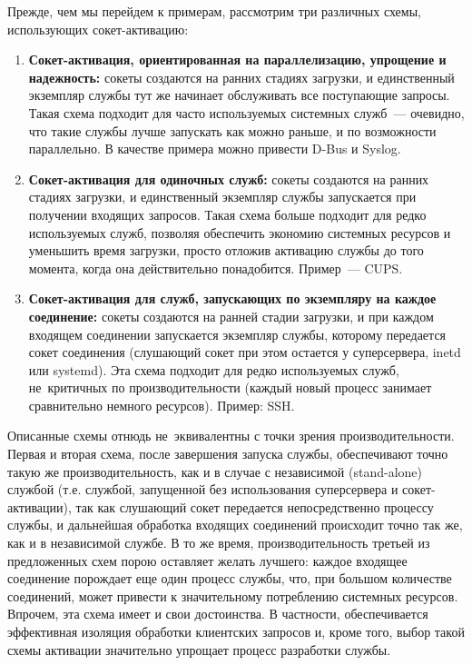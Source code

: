 \documentclass[10pt,oneside,a4paper]{article}
\begin{document}
Прежде, чем мы перейдем к примерам, рассмотрим три различных схемы, использующих
сокет-активацию:
\begin{enumerate}
	\item \textbf{Сокет-активация, ориентированная на параллелизацию,
		упрощение и надежность:} сокеты создаются на ранних стадиях
		загрузки, и единственный экземпляр службы тут же начинает
		обслуживать все поступающие запросы. Такая схема подходит для
		часто используемых системных служб~--- очевидно, что такие
		службы лучше запускать как можно раньше, и по возможности
		параллельно. В качестве примера можно привести D-Bus и Syslog.
	\item \textbf{Сокет-активация для одиночных служб:} сокеты создаются на
		ранних стадиях загрузки, и единственный экземпляр службы
		запускается при получении входящих запросов. Такая схема больше
		подходит для редко используемых служб, позволяя обеспечить
		экономию системных ресурсов и уменьшить время загрузки, просто
		отложив активацию службы до того момента, когда она
		действительно понадобится. Пример~--- CUPS.
	\item \textbf{Сокет-активация для служб, запускающих по экземпляру на
		каждое соединение:} сокеты создаются на ранней стадии загрузки,
		и при каждом входящем соединении запускается экземпляр службы,
		которому передается сокет соединения (слушающий сокет при этом
		остается у суперсервера, inetd или systemd). Эта схема подходит
		для редко используемых служб, не~критичных по производительности
		(каждый новый процесс занимает сравнительно немного ресурсов).
		Пример: SSH.
\end{enumerate}

Описанные схемы отнюдь не~эквивалентны с точки зрения производительности. Первая
и вторая схема, после завершения запуска службы, обеспечивают точно такую же
производительность, как и в случае с независимой (stand-alone) службой (т.е.
службой, запущенной без использования суперсервера и сокет-активации), так как
слушающий сокет передается непосредственно процессу службы, и дальнейшая
обработка входящих соединений происходит точно так же, как и в независимой
службе. В то же время, производительность третьей из предложенных схем порою
оставляет желать лучшего: каждое входящее соединение порождает еще один процесс
службы, что, при большом количестве соединений, может привести к значительному
потреблению системных ресурсов. Впрочем, эта схема имеет и свои достоинства.
В частности, обеспечивается эффективная изоляция обработки клиентских запросов
и, кроме того, выбор такой схемы активации значительно упрощает процесс
разработки службы.
\end{document}
